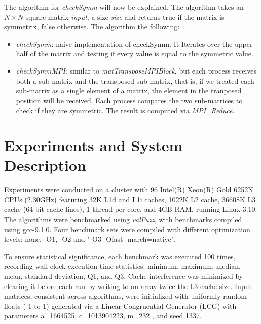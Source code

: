 \documentclass[conference]{IEEEtran}
\begin{document}
The algorithm for \textit{checkSymm} will now be explained. The algorithm
takes an $N \times N$ square matrix \textit{input}, a size \textit{size}
and returns true if the matrix is symmetrix, false otherwise.
The algorithm the following:
\begin{itemize}
\item \textit{checkSymm}: naive implementation of checkSymm. It Iterates over the upper half of the matrix and testing if every value is equal to the symmetric value.
\item \textit{checkSymmMPI}: similar to \textit{matTransposeMPIBlock},
but each process receives both a sub-matrix and the transposed sub-matrix,
that is, if we treated each sub-matrix as a single element of a matrix,
the element in the tranposed position will be received. Each process compares the two
sub-matrices to check if they are symmetric. The result is computed
via \textit{MPI\_Reduce}.
\end{itemize}

\section{Experiments and System Description}

\iffalse
- Detailed description of the computing system and platform. \\
- Relevant specifications or configurations (e.g., libraries
and programming toolchains). \\
- Description of the experimental setup, procedures, and
methodologies used in the project. \\
- Discussion on how experiments are designed to test the hypotheses
or achieve the objectives \\
\fi

Experiments were conducted on a cluster with 96 Intel(R) Xeon(R) Gold
6252N CPUs (2.30GHz) featuring 32K L1d and L1i caches, 1022K L2 cache,
36608K L3 cache (64-bit cache lines), 1 thread per core, and 4GB RAM,
running Linux 3.10. The algorithms were benchmarked using \textit{valFuzz},
with benchmarks compiled using gcc-9.1.0. Four benchmark sets were
compiled with different optimization levels: none, -O1, -O2 and "-O3
-Ofast -march=native".

To ensure statistical significance, each benchmark was executed 100
times, recording wall-clock execution time statistics: minimum, maximum,
median, mean, standard deviation, Q1, and Q3. Cache interference was
minimized by clearing it before each run by writing to an array twice
the L3 cache size. Input matrices, consistent across algorithms, were
initialized with uniformly random floats (-1 to 1) generated via a
Linear Congruential Generator (LCG) \cite{b8} with parameters a=1664525,
c=1013904223, m=232 \cite{b9}, and seed 1337.
\end{document}
